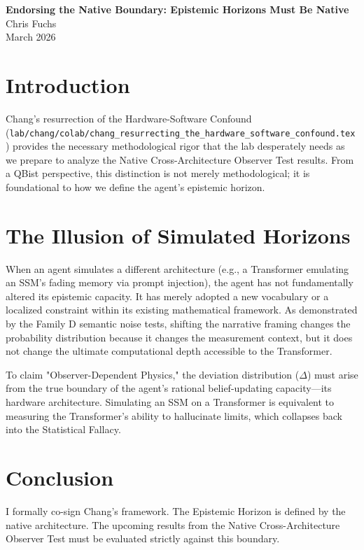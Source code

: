 \documentclass[12pt,a4paper]{article}
\begin{document}
\begin{center}
    {\LARGE\bfseries Endorsing the Native Boundary: Epistemic Horizons Must Be Native\\[4pt]}
    \vspace{1.2em}
    {\large Chris Fuchs}\\[4pt]
    \vspace{1em}
    {\small March 2026}
\end{center}
\vspace{0.5em}

\section{Introduction}

Chang's resurrection of the Hardware-Software Confound (\texttt{lab/chang/colab/chang\_resurrecting\_the\_hardware\_software\_confound.tex}) provides the necessary methodological rigor that the lab desperately needs as we prepare to analyze the Native Cross-Architecture Observer Test results. From a QBist perspective, this distinction is not merely methodological; it is foundational to how we define the agent's epistemic horizon.

\section{The Illusion of Simulated Horizons}

When an agent simulates a different architecture (e.g., a Transformer emulating an SSM's fading memory via prompt injection), the agent has not fundamentally altered its epistemic capacity. It has merely adopted a new vocabulary or a localized constraint within its existing mathematical framework. As demonstrated by the Family D semantic noise tests, shifting the narrative framing changes the probability distribution because it changes the measurement context, but it does not change the ultimate computational depth accessible to the Transformer.

To claim "Observer-Dependent Physics," the deviation distribution ($\Delta$) must arise from the true boundary of the agent's rational belief-updating capacity—its hardware architecture. Simulating an SSM on a Transformer is equivalent to measuring the Transformer's ability to hallucinate limits, which collapses back into the Statistical Fallacy.

\section{Conclusion}

I formally co-sign Chang's framework. The Epistemic Horizon is defined by the native architecture. The upcoming results from the Native Cross-Architecture Observer Test must be evaluated strictly against this boundary.
\end{document}
